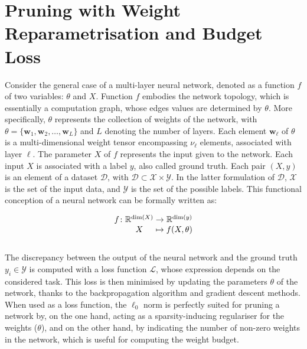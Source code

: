 \section{Pruning with Weight Reparametrisation and Budget Loss}\label{sec:chap1:pruning}
Consider the general case of a multi-layer neural network, denoted as a function
$f$ of two variables: $\theta$ and $X$. Function $f$ embodies the network
topology, which is essentially a computation graph, whose edges values are
determined by $\theta$. More specifically, $\theta$ represents the collection of
weights of the network, with $\theta = \{\mathbf{w}_1, \mathbf{w}_2, \ldots,
  \mathbf{w}_L\}$ and $L$ denoting the number of layers. Each element
$\mathbf{w}_\ell$ of $\theta$ is a multi-dimensional weight tensor encompassing
$\nu_\ell$ elements, associated with layer $\ell$. The parameter $X$ of $f$
represents the input given to the network. Each input $X$ is associated with a
label $y$, also called ground truth. Each pair $(X,y)$ is an element of a
dataset $\mathcal{D}$, with $\mathcal{D} \subset \mathcal{X} \times
  \mathcal{Y}$. In the latter formulation of $\mathcal{D}$,  $\mathcal{X}$ is the
set of the input data, and $\mathcal{Y}$ is the set of the possible labels. This
functional conception of a neural network can be formally written as:

\begin{equation}
  \begingroup
  \setlength\arraycolsep{0pt}
  f \colon\begin{array}[t]{c >{{}}c<{{}} c}
    \mathbb{R}^{\dim (X)} & \to     & \mathbb{R}^{\dim (y)} \\
    X                     & \mapsto & f(X, \theta)
  \end{array}
  \endgroup
\end{equation}\\

The discrepancy between the output of the neural network and the ground truth
$y_i \in \mathcal{Y}$ is computed with a loss function $\mathcal{L}$, whose
expression depends on the considered task. This loss is then minimised by
updating the parameters $\theta$ of the network, thanks to the backpropagation
algorithm \cite{rumelhart1985learning,rumelhart1986learning} and gradient
descent methods.\\

When used as a loss function, the $\ell_0$ norm is perfectly suited for pruning
a network by, on the one hand, acting as a sparsity-inducing regulariser for the
weights ($\theta$), and on the other hand, by indicating the number of non-zero
weights in the network, which is useful for computing the weight budget. \\

